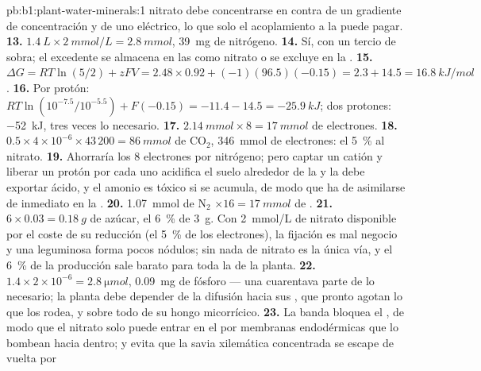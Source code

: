 \begin{solution}{pb:b1:plant-water-minerals:1}
nitrato debe concentrarse en contra de un gradiente de concentración y de
uno eléctrico, lo que solo el acoplamiento a la  puede
pagar.
\textbf{13.} $\qty{1.4}{L}\times\qty{2}{mmol/L} = \qty{2.8}{mmol}$,
\qty{39}{mg} de nitrógeno.
\textbf{14.} Sí, con un tercio de sobra; el excedente se almacena en las
 como nitrato o se excluye en la .
\textbf{15.} $\Delta G = RT\ln(5/2) + zFV = 2.48\times 0.92 + (-1)(96.5)(-0.15)
= 2.3 + 14.5 = \qty{16.8}{kJ/mol}$.
\textbf{16.} Por protón: $RT\ln(10^{-7.5}/10^{-5.5}) + F(-0.15) =
-11.4 - 14.5 = \qty{-25.9}{kJ}$; dos protones: \qty{-52}{kJ}, tres veces lo
necesario.
\textbf{17.} $\qty{2.14}{mmol}\times 8 = \qty{17}{mmol}$ de electrones.
\textbf{18.} $0.5\times 4\times 10^{-6}\times 43\,200 = \qty{86}{mmol}$ de
$\mathrm{CO_2}$, \qty{346}{mmol} de electrones: el \qty{5}{\%} al nitrato.
\textbf{19.} Ahorraría los 8 electrones por nitrógeno; pero captar un catión
y liberar un protón por cada uno acidifica el suelo alrededor de la  y
la  debe exportar ácido, y el amonio es tóxico si se acumula, de modo
que ha de asimilarse de inmediato en la .
\textbf{20.} \qty{1.07}{mmol} de $\mathrm{N_2}$ $\times 16 =
\qty{17}{mmol}$
de .
\textbf{21.} $6\times 0.03 = \qty{0.18}{g}$ de azúcar, el \qty{6}{\%} de
\qty{3}{g}. Con \qty{2}{mmol/L} de nitrato disponible por el coste de su
reducción (el \qty{5}{\%} de los electrones), la fijación es mal negocio y
una leguminosa forma pocos nódulos; sin nada de nitrato es la única vía, y
el \qty{6}{\%} de la producción sale barato para toda la  de la
planta.
\textbf{22.} $1.4\times 2\times 10^{-6} = \qty{2.8}{\micro mol}$,
\qty{0.09}{mg} de fósforo --- una cuarentava parte de lo necesario; la
planta debe depender de la difusión hacia sus , que pronto
agotan lo que los rodea, y sobre todo de su hongo micorrícico.
\textbf{23.} La banda bloquea el , de modo que el nitrato solo
puede entrar en el  por membranas endodérmicas que lo bombean hacia
dentro; y evita que la savia xilemática concentrada se escape de vuelta por

\end{solution}
